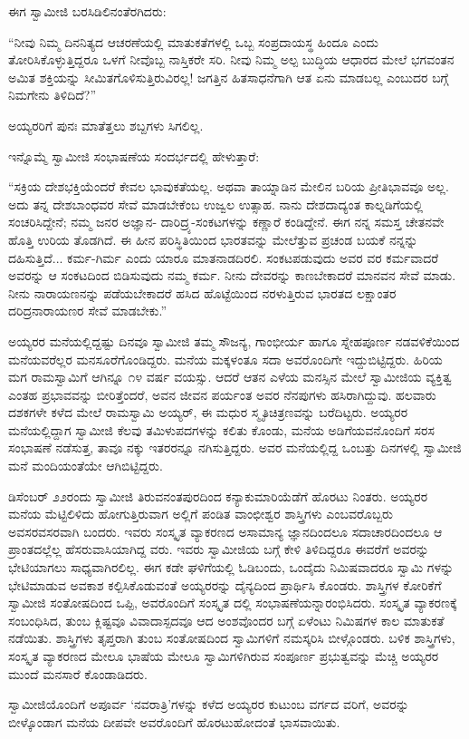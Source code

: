 ಈಗ ಸ್ವಾಮೀಜಿ ಬರಸಿಡಿಲಿನಂತೆರಗಿದರು:

“ನೀವು ನಿಮ್ಮ ದಿನನಿತ್ಯದ ಆಚರಣೆಯಲ್ಲಿ ಮಾತುಕತೆಗಳಲ್ಲಿ ಒಬ್ಬ ಸಂಪ್ರದಾಯಸ್ಥ ಹಿಂದೂ ಎಂದು ತೋರಿಸಿಕೊಳ್ಳುತ್ತಿದ್ದರೂ ಒಳಗೆ ನೀವೊಬ್ಬ ನಾಸ್ತಿಕರೇ ಸರಿ. ನೀವು ನಿಮ್ಮ ಅಲ್ಪ ಬುದ್ಧಿಯ ಆಧಾರದ ಮೇಲೆ ಭಗವಂತನ ಅಮಿತ ಶಕ್ತಿಯನ್ನು ಸೀಮಿತಗೊಳಿಸುತ್ತಿರುವಿರಲ್ಲ! ಜಗತ್ತಿನ ಹಿತಸಾಧನೆಗಾಗಿ ಆತ ಏನು ಮಾಡಬಲ್ಲ ಎಂಬುದರ ಬಗ್ಗೆ ನಿಮಗೇನು ತಿಳಿದಿದೆ?”

ಅಯ್ಯರರಿಗೆ ಪುನಃ ಮಾತೆತ್ತಲು ಶಬ್ದಗಳು ಸಿಗಲಿಲ್ಲ.

ಇನ್ನೊಮ್ಮೆ ಸ್ವಾಮೀಜಿ ಸಂಭಾಷಣೆಯ ಸಂದರ್ಭದಲ್ಲಿ ಹೇಳುತ್ತಾರೆ:

“ಸಕ್ರಿಯ ದೇಶಭಕ್ತಿಯೆಂದರೆ ಕೇವಲ ಭಾವುಕತೆಯಲ್ಲ. ಅಥವಾ ತಾಯ್ನಾಡಿನ ಮೇಲಿನ ಬರಿಯ ಪ್ರೀತಿಭಾವವೂ ಅಲ್ಲ. ಅದು ತನ್ನ ದೇಶಬಾಂಧವರ ಸೇವೆ ಮಾಡಬೇಕೆಂಬ ಉಜ್ವಲ ಉತ್ಸಾಹ. ನಾನು ದೇಶದಾದ್ಯಂತ ಕಾಲ್ನಡಿಗೆಯಲ್ಲಿ ಸಂಚರಿಸಿದ್ದೇನೆ; ನಮ್ಮ ಜನರ ಅಜ್ಞಾನ- ದಾರಿದ್ರ್ಯ-ಸಂಕಟಗಳನ್ನು ಕಣ್ಣಾರೆ ಕಂಡಿದ್ದೇನೆ. ಈಗ ನನ್ನ ಸಮಸ್ತ ಚೇತನವೇ ಹೊತ್ತಿ ಉರಿಯ ತೊಡಗಿದೆ. ಈ ಹೀನ ಪರಿಸ್ಥಿತಿಯಿಂದ ಭಾರತವನ್ನು ಮೇಲೆತ್ತುವ ಪ್ರಚಂಡ ಬಯಕೆ ನನ್ನನ್ನು ದಹಿಸುತ್ತಿದೆ... ಕರ್ಮ-ಗಿರ್ಮ ಎಂದು ಯಾರೂ ಮಾತನಾಡದಿರಲಿ. ಸಂಕಟಪಡುವುದು ಅವರ ವರ ಕರ್ಮವಾದರೆ ಅವರನ್ನು ಆ ಸಂಕಟದಿಂದ ಬಿಡಿಸುವುದು ನಮ್ಮ ಕರ್ಮ. ನೀನು ದೇವರನ್ನು ಕಾಣಬೇಕಾದರೆ ಮಾನವನ ಸೇವೆ ಮಾಡು. ನೀನು ನಾರಾಯಣನನ್ನು ಪಡೆಯಬೇಕಾದರೆ ಹಸಿದ ಹೊಟ್ಟೆಯಿಂದ ನರಳುತ್ತಿರುವ ಭಾರತದ ಲಕ್ಷಾಂತರ ದರಿದ್ರನಾರಾಯಣರ ಸೇವೆ ಮಾಡಬೇಕು.”

ಅಯ್ಯರರ ಮನೆಯಲ್ಲಿದ್ದಷ್ಟು ದಿನವೂ ಸ್ವಾಮೀಜಿ ತಮ್ಮ ಸೌಜನ್ಯ, ಗಾಂಭೀರ್ಯ ಹಾಗೂ ಸ್ನೇಹಪೂರ್ಣ ನಡವಳಿಕೆಯಿಂದ ಮನೆಯವರೆಲ್ಲರ ಮನಸೂರೆಗೊಂಡಿದ್ದರು. ಮನೆಯ ಮಕ್ಕಳಂತೂ ಸದಾ ಅವರೊಂದಿಗೇ ಇದ್ದುಬಿಟ್ಟಿದ್ದರು. ಹಿರಿಯ ಮಗ ರಾಮಸ್ವಾಮಿಗೆ ಆಗಿನ್ನೂ ೧೪ ವರ್ಷ ವಯಸ್ಸು. ಆದರೆ ಆತನ ಎಳೆಯ ಮನಸ್ಸಿನ ಮೇಲೆ ಸ್ವಾಮೀಜಿಯ ವ್ಯಕ್ತಿತ್ವ ಎಂತಹ ಪ್ರಭಾವವನ್ನು ಬೀರಿತ್ತೆಂದರೆ, ಅವನ ಜೀವನ ಪರ್ಯಂತ ಅವರ ನೆನಪುಗಳು ಹಸಿರಾಗಿದ್ದುವು. ಹಲವಾರು ದಶಕಗಳೇ ಕಳೆದ ಮೇಲೆ ರಾಮಸ್ವಾಮಿ ಅಯ್ಯರ್, ಈ ಮಧುರ ಸ್ಮೃತಿಚಿತ್ರಣವನ್ನು ಬರೆದಿಟ್ಟರು. ಅಯ್ಯರರ ಮನೆಯಲ್ಲಿದ್ದಾಗ ಸ್ವಾಮೀಜಿ ಕೆಲವು ತಮಿಳುಪದಗಳನ್ನು ಕಲಿತು ಕೊಂಡು, ಮನೆಯ ಅಡಿಗೆಯವನೊಂದಿಗೆ ಸರಸ ಸಂಭಾಷಣೆ ನಡೆಸುತ್ತ, ತಾವೂ ನಕ್ಕು ಇತರರನ್ನೂ ನಗಿಸುತ್ತಿದ್ದರು. ಅವರ ಮನೆಯಲ್ಲಿದ್ದ ಒಂಬತ್ತು ದಿನಗಳಲ್ಲಿ ಸ್ವಾಮೀಜಿ ಮನೆ ಮಂದಿಯಂತೆಯೇ ಆಗಿಬಿಟ್ಟಿದ್ದರು.

ಡಿಸೆಂಬರ್ ೨೨ರಂದು ಸ್ವಾಮೀಜಿ ತಿರುವನಂತಪುರದಿಂದ ಕನ್ಯಾಕುಮಾರಿಯೆಡೆಗೆ ಹೊರಟು ನಿಂತರು. ಅಯ್ಯರರ ಮನೆಯ ಮೆಟ್ಟಿಲಿಳಿದು ಹೋಗುತ್ತಿರುವಾಗ ಅಲ್ಲಿಗೆ ಪಂಡಿತ ವಾಂಛೀಶ್ವರ ಶಾಸ್ತ್ರಿಗಳು ಎಂಬವರೊಬ್ಬರು ಅವಸರವಸರವಾಗಿ ಬಂದರು. ಇವರು ಸಂಸ್ಕೃತ ವ್ಯಾಕರಣದ ಅಸಾಮಾನ್ಯ ಜ್ಞಾನದಿಂದಲೂ ಸದಾಚಾರದಿಂದಲೂ ಆ ಪ್ರಾಂತದಲ್ಲೆಲ್ಲ ಹೆಸರುವಾಸಿಯಾಗಿದ್ದ ವರು. ಇವರು ಸ್ವಾಮೀಜಿಯ ಬಗ್ಗೆ ಕೇಳಿ ತಿಳಿದಿದ್ದರೂ ಈವರೆಗೆ ಅವರನ್ನು ಭೇಟಿಯಾಗಲು ಸಾಧ್ಯವಾಗಿರಲಿಲ್ಲ. ಈಗ ಕಡೇ ಘಳಿಗೆಯಲ್ಲಿ ಓಡಿಬಂದು, ಒಂದೈದು ನಿಮಿಷವಾದರೂ ಸ್ವಾಮಿ ಗಳನ್ನು ಭೇಟಿಮಾಡುವ ಅವಕಾಶ ಕಲ್ಪಿಸಿಕೊಡುವಂತೆ ಅಯ್ಯರರನ್ನು ದೈನ್ಯದಿಂದ ಪ್ರಾರ್ಥಿಸಿ ಕೊಂಡರು. ಶಾಸ್ತ್ರಿಗಳ ಕೋರಿಕೆಗೆ ಸ್ವಾಮೀಜಿ ಸಂತೋಷದಿಂದ ಒಪ್ಪಿ, ಅವರೊಂದಿಗೆ ಸಂಸ್ಕೃತ ದಲ್ಲಿ ಸಂಭಾಷಣೆಯನ್ನಾರಂಭಿಸಿದರು. ಸಂಸ್ಕೃತ ವ್ಯಾಕರಣಕ್ಕೆ ಸಂಬಂಧಿಸಿದ, ತುಂಬ ಕ್ಲಿಷ್ಟವೂ ವಿವಾದಾಸ್ಪದವೂ ಆದ ಅಂಶವೊಂದರ ಬಗ್ಗೆ ಏಳೆಂಟು ನಿಮಿಷಗಳ ಕಾಲ ಮಾತುಕತೆ ನಡೆಯಿತು. ಶಾಸ್ತ್ರಿಗಳು ತೃಪ್ತರಾಗಿ ತುಂಬ ಸಂತೋಷದಿಂದ ಸ್ವಾಮಿಗಳಿಗೆ ನಮಸ್ಕರಿಸಿ ಬೀಳ್ಗೊಂಡರು. ಬಳಿಕ ಶಾಸ್ತ್ರಿಗಳು, ಸಂಸ್ಕೃತ ವ್ಯಾಕರಣದ ಮೇಲೂ ಭಾಷೆಯ ಮೇಲೂ ಸ್ವಾಮಿಗಳಿಗಿರುವ ಸಂಪೂರ್ಣ ಪ್ರಭುತ್ವವನ್ನು ಮೆಚ್ಚಿ ಅಯ್ಯರರ ಮುಂದೆ ಮನಸಾರೆ ಕೊಂಡಾಡಿದರು.

ಸ್ವಾಮೀಜಿಯೊಂದಿಗೆ ಅಪೂರ್ವ ‘ನವರಾತ್ರಿ’ಗಳನ್ನು ಕಳೆದ ಅಯ್ಯರರ ಕುಟುಂಬ ವರ್ಗದ ವರಿಗೆ, ಅವರನ್ನು ಬೀಳ್ಕೊಂಡಾಗ ಮನೆಯ ದೀಪವೇ ಅವರೊಂದಿಗೆ ಹೊರಟುಹೋದಂತೆ ಭಾಸವಾಯಿತು.

